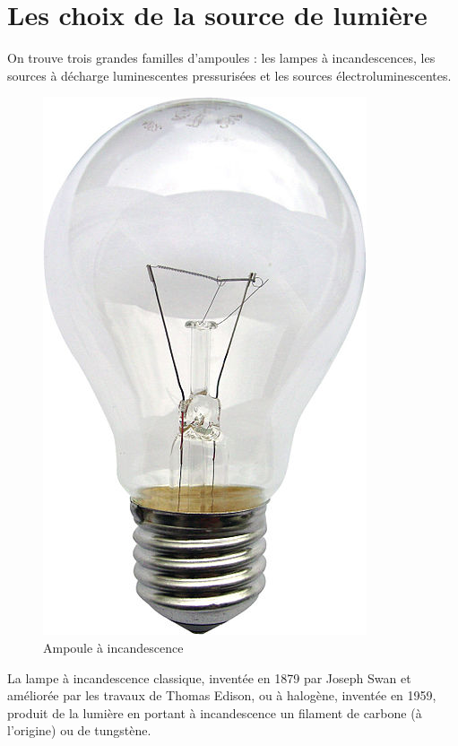 \documentclass[a4paper, 12pt, french]{article}
\begin{document}



\pagebreak
\section{Les choix de la source de lumière} %
\label{sec:les_choix_de_la_source_de_lumi_re}
	
	
On trouve trois grandes familles d'ampoules : les lampes à incandescences, les sources à décharge luminescentes pressurisées et les sources électroluminescentes.
	
\begin{figure}
  	\centering
  	\includegraphics[scale= 0.2]{incandescence.jpg}
  	\caption{Ampoule à incandescence}
\end{figure}
	
La lampe à incandescence classique, inventée en 1879 par Joseph Swan et améliorée par les travaux de Thomas Edison, ou à halogène, inventée en 1959, produit de la lumière en portant à incandescence un filament de carbone (à l'origine) ou de tungstène.\\
	
\end{document}
